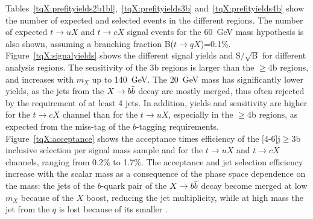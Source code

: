 Tables~\ref{tqX:prefityields2b1bl},~\ref{tqX:prefityields3b} and~\ref{tqX:prefityields4b} show the number of expected and selected events in the different regions. The number of expected $t\to uX$ and $t\to cX$ signal events for the 60~GeV mass hypothesis is also shown, assuming a branching fraction B($t\to qX$)=0.1\%.\\

Figure~\ref{tqX:signalyields} shows the different signal yields and $\text{S}/\sqrt{\text{B}}$ for different analysis regions. The sensitivity of the 3b regions is larger than the $\geq$4b regions, and increases with $m_{X}$ up to 140~GeV. The 20~GeV mass has significantly lower yields, as the jets from the $X\to b\bar{b}$ decay are mostly merged, thus often rejected by the requirement of at least 4 jets. In addition, yields and sensitivity are higher for the $t\to cX$ channel than for the $t\to uX$, especially in the $\geq$4b regions, as expected from the miss-tag of the $b$-tagging requirements.\\

Figure~\ref{tqX:acceptance} shows the acceptance times efficiency of the [4-6]j$\geq$3b inclusive selection per signal mass sample and for the $t\to uX$ and $t\to cX$ channels, ranging from 0.2\% to 1.7\%. The acceptance and jet selection efficiency increase with the scalar mass as a consequence of the phase space dependence on the mass: the jets of the $b$-quark pair of the $X\to b\bar{b}$ decay become merged at low $m_X$ because of the $X$ boost, reducing the jet multiplicity, while at high mass the jet from the $q$ is lost because of its smaller \pT.\\

